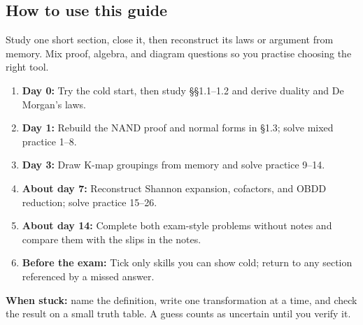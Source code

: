 \documentclass[11pt]{article}
\begin{document}
\begin{keepsection}
\section{How to use this guide}

Study one short section, close it, then reconstruct its laws or argument from memory. Mix proof, algebra, and diagram questions so you practise choosing the right tool.

\begin{enumerate}
\item \textbf{Day 0:} Try the cold start, then study §§1.1–1.2 and derive duality and De Morgan’s laws.
\item \textbf{Day 1:} Rebuild the NAND proof and normal forms in §1.3; solve mixed practice 1–8.
\item \textbf{Day 3:} Draw K-map groupings from memory and solve practice 9–14.
\item \textbf{About day 7:} Reconstruct Shannon expansion, cofactors, and OBDD reduction; solve practice 15–26.
\item \textbf{About day 14:} Complete both exam-style problems without notes and compare them with the slips in the notes.
\item \textbf{Before the exam:} Tick only skills you can show cold; return to any section referenced by a missed answer.
\end{enumerate}

\begin{notebox}\textbf{When stuck:} name the definition, write one transformation at a time, and check the result on a small truth table. A guess counts as uncertain until you verify it.\end{notebox}
\end{keepsection}
\end{document}

